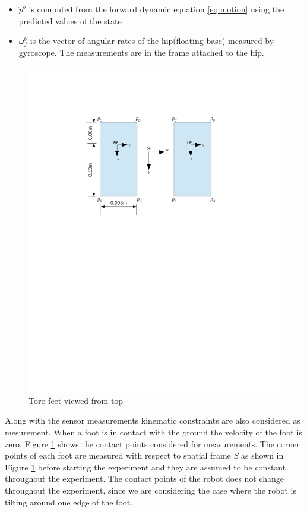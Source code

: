 \begin{enumerate}
\begin{itemize}
    \item $\ddot{p}^b$ is computed from the forward dynamic equation \ref{eq:motion} using the predicted values of the state
    \item $\omega_{f}^{b} $ is the vector of angular rates of the hip(floating base) measured by gyroscope. The measurements are in the frame attached to the hip. 
\end{itemize}
\begin{figure}
    \begin{center}
    \includegraphics[trim= 20mm 150mm 20mm 50mm,scale=0.80]{Bilder/foot_topview.pdf}
    \caption{Toro feet viewed from top}
    \label{fig:biped_feet}
    \end{center}
\end{figure}
Along with the sensor measurements kinematic constraints are also considered as mesurement. When a foot is in contact with the ground the velocity of the foot is zero. Figure \ref{fig:biped_feet} shows the contact points considered for measurements. The corner points of each foot are measured with respect to spatial frame \emph{S} as shown in Figure \ref{fig:biped_feet} before starting the experiment and they are assumed to be constant throughout the experiment. The contact points of the robot does not change throughout the experiment, since we are considering the case where the robot is tilting around one edge of the foot. 

\end{enumerate}
